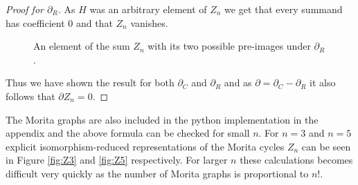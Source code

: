 \begin{proof}[Proof for $\partial_{R}$]
	As $H$ was an arbitrary element of $Z_{n}$ we get that every summand has coefficient $0$ and that $Z_{n}$ vanishes.

	\begin{figure}
		\centering
		\caption{An element of the sum $Z_{n}$ with its two possible pre-images under $\partial_{R}$.}
		\label{fig:MoritaCycleDR}
	\end{figure}
	Thus we have shown the result for both $\partial_{C}$ and $\partial_{R}$ and as $\partial = \partial_{C} - \partial_{R}$ it also follows that $\partial Z_{n} = 0$.
\end{proof}

\begin{remark}
	The Morita graphs are also included in the python implementation in the appendix and the above formula can be checked for small $n$.
	For $n=3$ and $n=5$ explicit isomorphism-reduced representations of the Morita cycles $Z_{n}$ can be seen in Figure \ref{fig:Z3} and \ref{fig:Z5} respectively.
	For larger $n$ these calculations becomes difficult very quickly as the number of Morita graphs is proportional to $n!$.
\end{remark}

